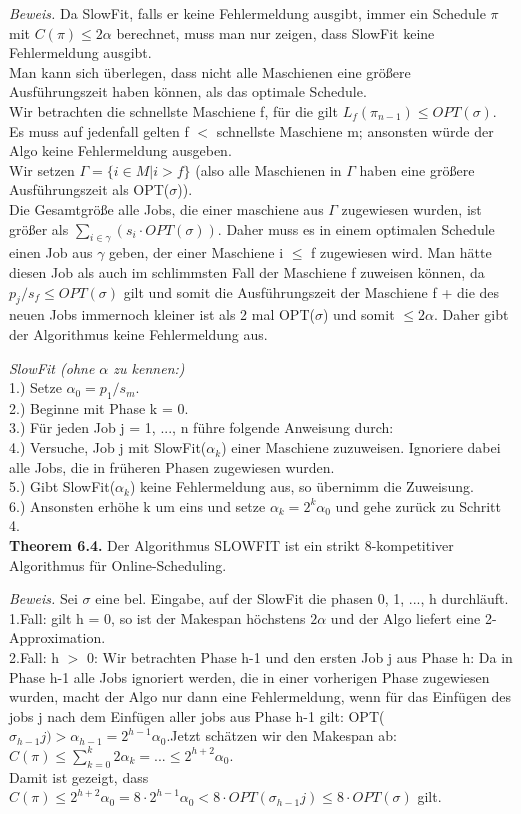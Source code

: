 \textit{Beweis.} Da SlowFit, falls er keine Fehlermeldung ausgibt, immer ein Schedule $\pi$ mit $C(\pi) \le 2 \alpha$ berechnet, muss man nur zeigen, dass SlowFit keine Fehlermeldung ausgibt.\\
Man kann sich überlegen, dass nicht alle Maschienen eine größere Ausführungszeit haben können, als das optimale Schedule. \\
Wir betrachten die schnellste Maschiene f, für die gilt $L_{f}(\pi_{n-1}) \le OPT(\sigma)$. Es muss auf jedenfall gelten f $<$ schnellste Maschiene m; ansonsten würde der Algo keine Fehlermeldung ausgeben.\\
Wir setzen $\Gamma = \{i \in M | i > f\}$ (also alle Maschienen in $\Gamma$ haben eine größere Ausführungszeit als OPT($\sigma$)).\\
Die Gesamtgröße alle Jobs, die einer maschiene aus $\Gamma$ zugewiesen wurden, ist größer als $\sum_{i \in \gamma}(s_{i} \cdot OPT(\sigma))$. Daher muss es in einem optimalen Schedule einen Job aus $\gamma$ geben, der einer Maschiene i $\le$ f zugewiesen wird. Man hätte diesen Job als auch im schlimmsten Fall der Maschiene f zuweisen können, da $p_{j}/s_{f} \le OPT(\sigma)$ gilt und somit die Ausführungszeit der Maschiene f + die des neuen Jobs immernoch kleiner ist als 2 mal OPT($\sigma$) und somit $\le 2\alpha$. Daher gibt der Algorithmus keine Fehlermeldung aus.

\textit{SlowFit (ohne $\alpha$ zu kennen:)}\\
1.) Setze $\alpha_{0} = p_{1}/s_{m}$. \\
2.) Beginne mit Phase k = 0. \\
3.) Für jeden Job j = 1, ..., n führe folgende Anweisung durch: \\
4.) Versuche, Job j mit SlowFit($\alpha_{k}$) einer Maschiene zuzuweisen. Ignoriere dabei alle Jobs, die in früheren Phasen zugewiesen wurden. \\
5.) Gibt SlowFit($\alpha_{k}$) keine Fehlermeldung aus, so übernimm die Zuweisung. \\
6.) Ansonsten erhöhe k um eins und setze $\alpha_{k} = 2^{k}\alpha_{0}$ und gehe zurück zu Schritt 4. \\


\textbf{Theorem 6.4.} Der Algorithmus SLOWFIT ist ein strikt 8-kompetitiver Algorithmus für Online-Scheduling.

\textit{Beweis.} Sei $\sigma$ eine bel. Eingabe, auf der SlowFit die phasen 0, 1, ..., h durchläuft.\\
1.Fall: gilt h = 0, so ist der Makespan höchstens $2\alpha$ und der Algo liefert eine 2-Approximation.\\
2.Fall: h $>$ 0: Wir betrachten Phase h-1 und den ersten Job j aus Phase h: Da in Phase h-1 alle Jobs ignoriert werden, die in einer vorherigen Phase zugewiesen wurden, macht der Algo nur dann eine Fehlermeldung, wenn für das Einfügen des jobs j nach dem Einfügen aller jobs aus Phase h-1 gilt: OPT($\sigma_{h-1}j) > \alpha_{h-1} = 2^{h-1}\alpha_{0}$.Jetzt schätzen wir den Makespan ab: $C(\pi) \le \sum_{k=0}^{k}2\alpha_{k} = ... \le 2^{h+2}\alpha_{0}$.\\
Damit ist gezeigt, dass $C(\pi) \le 2^{h+2}\alpha_{0} = 8 \cdot 2^{h-1} \alpha_{0} < 8 \cdot OPT(\sigma_{h-1}j) \le 8 \cdot OPT(\sigma)$ gilt.
